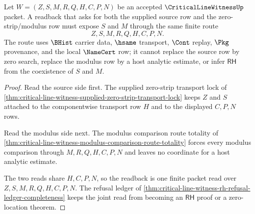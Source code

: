 \begin{theorem}
\label{thm:critical-line-witness-source-modulus-readback}
Let $W=(Z,S,M,R,Q,H,C,P,N)$ be an accepted $\CriticalLineWitnessUp$ packet. A readback that asks for both the supplied source row and the zero-strip/modulus row must expose $S$ and $M$ through the same finite route
$$
Z,S,M,R,Q,H,C,P,N.
$$
The route uses $\BHist$ carrier data, $\hsame$ transport, $\Cont$ replay, $\Pkg$ provenance, and the local $\NameCert$ row; it cannot replace the source row by zero search, replace the modulus row by a host analytic estimate, or infer $\mathsf{RH}$ from the coexistence of $S$ and $M$.
\end{theorem}
\begin{proof}
Read the source side first. The supplied zero-strip transport lock of \autoref{thm:critical-line-witness-supplied-zero-strip-transport-lock} keeps $Z$ and $S$ attached to the componentwise transport row $H$ and to the displayed $C,P,N$ rows.

Read the modulus side next. The modulus comparison route totality of \autoref{thm:critical-line-witness-modulus-comparison-route-totality} forces every modulus comparison through $M,R,Q,H,C,P,N$ and leaves no coordinate for a host analytic estimate.

The two reads share $H,C,P,N$, so the readback is one finite packet read over $Z,S,M,R,Q,H,C,P,N$. The refusal ledger of \autoref{thm:critical-line-witness-rh-refusal-ledger-completeness} keeps the joint read from becoming an $\mathsf{RH}$ proof or a zero-location theorem.
\end{proof}

